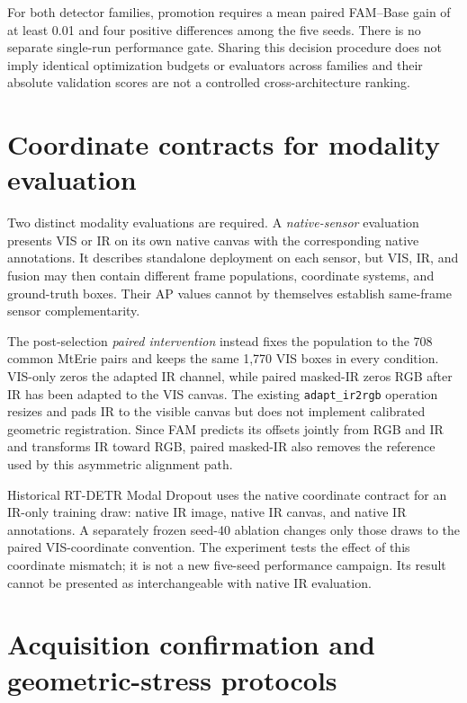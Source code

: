 For both detector families, promotion requires a mean paired FAM--Base
gain of at least 0.01 and four positive differences among the five seeds.
There is no separate single-run performance gate. Sharing this decision
procedure does not imply identical optimization budgets or evaluators across
families and their absolute validation scores are not a controlled
cross-architecture ranking.

\section{Coordinate contracts for modality evaluation}
\label{sec:coordinate-contracts}

Two distinct modality evaluations are required. A \emph{native-sensor}
evaluation presents VIS or IR on its own native canvas with the corresponding
native annotations. It describes standalone deployment on each sensor, but VIS,
IR, and fusion may then contain different frame populations, coordinate systems,
and ground-truth boxes. Their AP values cannot by themselves establish
same-frame sensor complementarity.

The post-selection \emph{paired intervention} instead fixes the population to
the 708 common MtErie pairs and keeps the same 1,770 VIS boxes in every
condition. VIS-only zeros the adapted IR channel, while paired masked-IR
zeros RGB after IR has been adapted to the VIS canvas. The existing
\texttt{adapt\_ir2rgb} operation resizes and pads IR to the visible canvas but
does not implement calibrated geometric registration. Since FAM predicts its
offsets jointly from RGB and IR and transforms IR toward RGB, paired masked-IR
also removes the reference used by this asymmetric alignment path.

Historical RT-DETR Modal Dropout uses the native coordinate contract for an
IR-only training draw: native IR image, native IR canvas, and native IR
annotations. A separately frozen seed-40 ablation changes only those draws to
the paired VIS-coordinate convention. The experiment tests the effect of this
coordinate mismatch; it is not a new five-seed performance campaign. Its result
cannot be presented as interchangeable with native IR evaluation.

\section{Acquisition confirmation and geometric-stress protocols}
\label{sec:late-followup-protocols}

